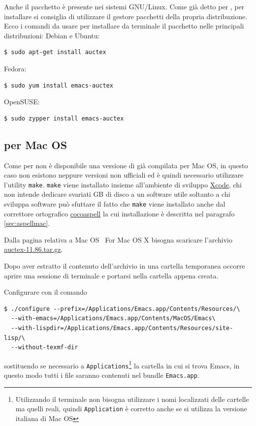 \documentclass[11pt,a4paper]{article}
\begin{document}
Anche il pacchetto \auctex{} è presente nei sistemi GNU/Linux. Come
già detto per \emacs, per installare \auctex{} si consiglia di
utilizzare il gestore pacchetti della propria distribuzione. Ecco i
comandi da usare per installare da terminale il pacchetto nelle
principali distribuzioni: Debian e Ubuntu:
\begin{Verbatim}
$ sudo apt-get install auctex
\end{Verbatim}
Fedora:
\begin{Verbatim}
$ sudo yum install emacs-auctex
\end{Verbatim}
OpenSUSE:
\begin{Verbatim}
$ sudo zypper install emacs-auctex
\end{Verbatim}


\subsection{\auctex{} per Mac OS}
\label{sec:auctexmac}

Come per \emacs{} non è disponibile una versione di \auctex{} già
compilata per Mac OS, in questo caso non esistono neppure versioni non
ufficiali ed è quindi necessario utilizzare l'utility \texttt{make}.
\texttt{make} viene installato insieme all'ambiente di sviluppo
\href{http://developer.apple.com/technologies/tools/whats-new.html}%
{Xcode}, chi non intende dedicare svariati GB di disco a un software
utile soltanto a chi sviluppa software può sfuttare il fatto che
\texttt{make} viene installato anche dal correttore ortografico
\href{http://cocoaspell.leuski.net/}{cocoaspell} la cui installazione
è descritta nel paragrafo \ref{sec:aspellmac}.

Dalla pagina relativa a Mac OS
%
{\auctex\ For Mac OS X} bisogna scaricare l'archivio
\href{http://ftp.gnu.org/pub/gnu/auctex/auctex-11.86.tar.gz}%
{auctex-11.86.tar.gz}.

Dopo aver estratto il contenuto dell'archivio in una cartella
temporanea occorre aprire una sessione di terminale e portarsi nella
cartella appena creata.

Configurare \auctex{} con il comando
\begin{Verbatim}
$ ./configure --prefix=/Applications/Emacs.app/Contents/Resources/\
  --with-emacs=/Applications/Emacs.app/Contents/MacOS/Emacs\
  --with-lispdir=/Applications/Emacs.app/Contents/Resources/site-lisp/\
  --without-texmf-dir
\end{Verbatim}
sostituendo se necessario a \texttt{Applications}\footnote{Utilizzando
  il terminale non bisogna utilizzare i nomi localizzati delle
  cartelle ma quelli reali, quindi \texttt{Application} è corretto
  anche se si utilizza la versione italiana di Mac OS} la cartella in
cui si trova Emacs, in questo modo tutti i file saranno contenuti nel
bundle \texttt{Emacs.app}.
\end{document}
